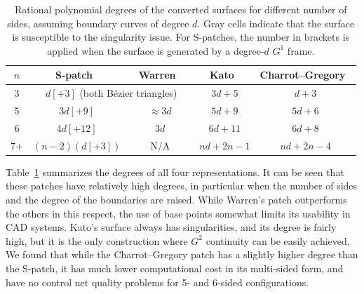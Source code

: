 \documentclass{article}
\begin{document}

\begin{table}
  \centering
  \begin{tabular}{c|c|c|c|c}
    $n$ & S-patch~\cite{spatch1} & Warren~\cite{warren} & Kato~\cite{kato} & Charrot--Gregory~\cite{charrot} \\ \hline
    3 & \multicolumn{2}{c|}{$d[+3]$ (both B\'ezier triangles)} & \cellcolor{light-gray}$3d+5$ & $d+3$ \\ \hline
    5 & \cellcolor{light-light-gray}$3d[+9]$ & $\approx 3d$ & \cellcolor{light-gray}$5d+9$ & $5d+6$ \\ \hline
    6 & \cellcolor{light-light-gray}$4d[+12]$ & $3d$ & \cellcolor{light-gray}$6d+11$ & $6d+8$ \\ \hline
    7+ & \cellcolor{light-gray}$(n-2)(d[+3])$ & $\qquad$N/A$\qquad$ & \cellcolor{light-gray}$nd+2n-1$ & \cellcolor{light-gray}$nd+2n-4$ \\ \hline
  \end{tabular}
  \caption{Rational polynomial degrees of the converted surfaces for different number of sides,
    assuming boundary curves of degree $d$. Gray cells indicate that the surface is susceptible to
    the singularity issue.
    For S-patches, the number in brackets is applied
    when the surface is generated by a degree-$d$ $G^1$ frame.}
  \label{tab:degrees}
\end{table}

Table~\ref{tab:degrees} summarizes the degrees of all four representations.
It can be seen that these patches
have relatively high degrees, in particular when the number of sides and the degree of the
boundaries are raised. While Warren's patch outperforms the others in this respect,
the use of base points somewhat limits its usability in CAD systems.
Kato's surface always has singularities, and its degree is fairly high, but it is the only
construction where $G^2$ continuity can be easily achieved. We found that while the
Charrot--Gregory patch has a slightly higher degree than the S-patch, it has much lower
computational cost in its multi-sided form, and have no control net quality problems for 5-
and 6-sided configurations.
\end{document}
